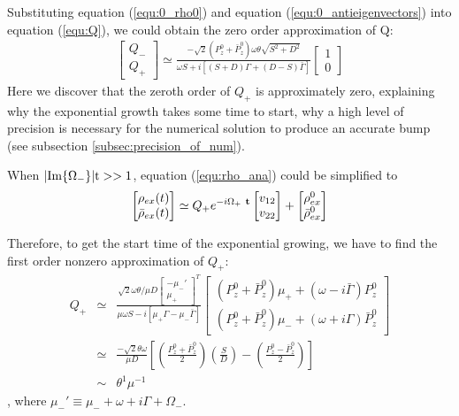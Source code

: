 \documentclass[aps,prd,twocolumn,amsmath,amssymb,groupedaddress]{revtex4-2}
\begin{document}
Substituting equation (\ref{equ:0_rho0}) and equation (\ref{equ:0_antieigenvectors}) into equation (\ref{equ:Q}), we could obtain the zero order approximation of Q:
\begin{eqnarray}
	\label{equ:0_Q}
	\begin{bmatrix}
		Q_- \\ Q_+
	\end{bmatrix} \simeq \frac{-\sqrt{2} \left(P_{z}^0 + \bar{P}_{z}^0\right)\omega \theta \sqrt{S^2+D^2}}{\omega S + i\left[(S+D) \Gamma + (D-S) \bar{\Gamma}\right]}
	\begin{bmatrix}
	1 \\ 0
	\end{bmatrix}
\end{eqnarray}
Here we discover that the zeroth order of $Q_+$ is approximately zero, explaining why the exponential growth takes some time to start,  why a high level of precision is necessary for the numerical solution to produce an accurate bump (see subsection \ref{subsec:precision_of_num}).

When $|\rm{Im}\{\Omega_-\}| t>>1$, equation (\ref{equ:rho_ana}) could be simplified to
\begin{eqnarray}
	\begin{bmatrix}
		\rho_{ex} (t)\\ \bar{\rho}_{ex} (t)
	\end{bmatrix}
	\simeq
	Q_+e^{-i \Omega_{+} ~\bf{t}}
	\begin{bmatrix}
		v_{12}  \\ v_{22}
	\end{bmatrix} + 
	\begin{bmatrix} 
		\rho^0_{ex} \\ \bar{\rho}^0_{ex}
	\end{bmatrix}
\end{eqnarray}

Therefore, to get the start time of the exponential growing, we have to find the first order nonzero approximation of $Q_+$:
\begin{eqnarray}
	\label{equ:Qp}
	Q_+	&\simeq&
	\frac{\sqrt{2}\omega \theta/ \mu D \begin{bmatrix}
			-\mu_-' \\ \mu_+
		\end{bmatrix}^T}{\mu \omega S - i \left[\mu_+ \Gamma - \mu_- \bar{\Gamma} \right]}
	\begin{bmatrix}
		\left(P_z^0 + \bar{P}_{z}^0\right)\mu_+ + (\omega - i \bar{\Gamma})P_z^0  \\ \left(P_z^0 + \bar{P}_{z}^0\right)\mu_- + (\omega + i \Gamma)\bar{P}_{z}^0
	\end{bmatrix} \nonumber \\
	&\simeq&
	\frac{-\sqrt{2} \theta\omega}{\mu D}\left[\left(\frac{P_z^0 + \bar{P}_{z}^0}{2}\right)\left(\frac{S}{D}\right)-\left(\frac{P_z^0 - \bar{P}_{z}^0}{2}\right)\right]\\
	&\sim&
	\theta^1 \mu^{-1}
\end{eqnarray}, where $\mu_-' \equiv \mu_- + \omega + i \Gamma + \Omega_-$.
\end{document}
